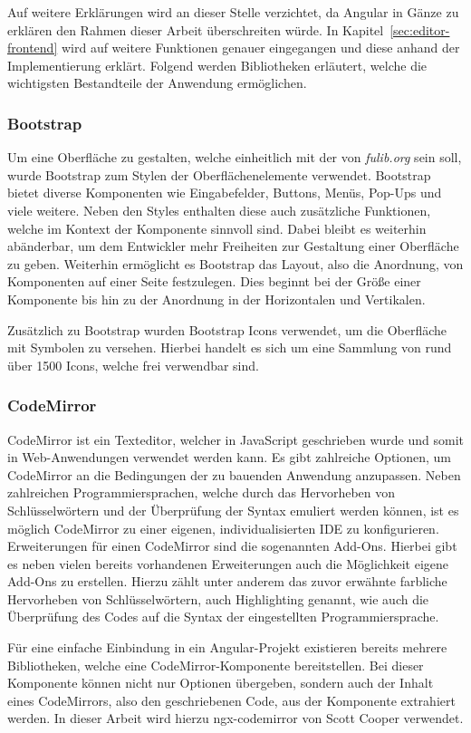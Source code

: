 Auf weitere Erklärungen wird an dieser Stelle verzichtet, da Angular in Gänze zu erklären den Rahmen dieser Arbeit überschreiten würde.
In Kapitel~\ref{sec:editor-frontend} wird auf weitere Funktionen genauer eingegangen und diese anhand der Implementierung erklärt.
Folgend werden Bibliotheken erläutert, welche die wichtigsten Bestandteile der Anwendung ermöglichen.

\subsubsection{Bootstrap}
Um eine Oberfläche zu gestalten, welche einheitlich mit der von \textit{fulib.org} sein soll, wurde Bootstrap zum
Stylen der Oberflächenelemente verwendet.
Bootstrap bietet diverse Komponenten wie Eingabefelder, Buttons, Menüs, Pop-Ups und viele weitere.
Neben den Styles enthalten diese auch zusätzliche Funktionen, welche im Kontext der Komponente sinnvoll sind.
Dabei bleibt es weiterhin abänderbar, um dem Entwickler mehr Freiheiten zur Gestaltung einer Oberfläche zu geben.
Weiterhin ermöglicht es Bootstrap das Layout, also die Anordnung, von Komponenten auf einer Seite festzulegen.
Dies beginnt bei der Größe einer Komponente bis hin zu der Anordnung in der Horizontalen und Vertikalen\cite*{bs}.

Zusätzlich zu Bootstrap wurden Bootstrap Icons verwendet, um die Oberfläche mit Symbolen zu versehen.
Hierbei handelt es sich um eine Sammlung von rund über 1500 Icons, welche frei verwendbar sind\cite*{bsIcons}.

\subsubsection{CodeMirror}
CodeMirror ist ein Texteditor, welcher in JavaScript geschrieben wurde und somit in Web-Anwendungen verwendet werden kann.
Es gibt zahlreiche Optionen, um CodeMirror an die Bedingungen der zu bauenden Anwendung anzupassen.
Neben zahlreichen Programmiersprachen, welche durch das Hervorheben von Schlüsselwörtern und der Überprüfung der Syntax emuliert werden können,
ist es möglich CodeMirror zu einer eigenen, individualisierten IDE zu konfigurieren.
Erweiterungen für einen CodeMirror sind die sogenannten Add-Ons.
Hierbei gibt es neben vielen bereits vorhandenen Erweiterungen auch die Möglichkeit eigene Add-Ons zu erstellen.
Hierzu zählt unter anderem das zuvor erwähnte farbliche Hervorheben von Schlüsselwörtern, auch Highlighting genannt, wie auch die
Überprüfung des Codes auf die Syntax der eingestellten Programmiersprache\cite*{cm}.

Für eine einfache Einbindung in ein Angular-Projekt existieren bereits mehrere Bibliotheken, welche eine CodeMirror-Komponente bereitstellen.
Bei dieser Komponente können nicht nur Optionen übergeben, sondern auch der Inhalt eines CodeMirrors, also den geschriebenen Code, aus der Komponente
extrahiert werden.
In dieser Arbeit wird hierzu ngx-codemirror von Scott Cooper verwendet\cite*{ngxcm}.
